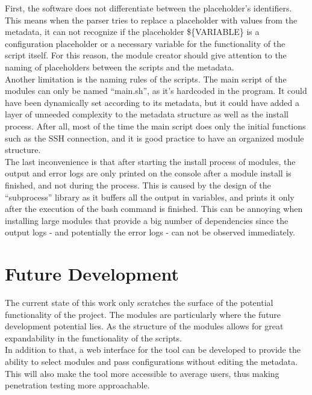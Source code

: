 First, the software does not differentiate between the placeholder’s identifiers. This means when the parser tries to replace a placeholder with values from the metadata, it can not recognize if the placeholder \$\{VARIABLE\} is a configuration placeholder or a necessary variable for the functionality of the script itself. For this reason, the module creator should give attention to the naming of placeholders between the scripts and the metadata.\\
Another limitation is the naming rules of the scripts. The main script of the modules can only be named “main.sh”, as it’s hardcoded in the program. It could have been dynamically set according to its metadata, but it could have added a layer of unneeded complexity to the metadata structure as well as the install process. After all, most of the time the main script does only the initial functions such as the SSH connection, and it is good practice to have an organized module structure.\\
The last inconvenience is that after starting the install process of modules, the output and error logs are only printed on the console after a module install is finished, and not during the process. This is caused by the design of the “subprocess” library as it buffers all the output in variables, and prints it only after the execution of the bash command is finished. This can be annoying when installing large modules that provide a big number of dependencies since the output logs - and potentially the error logs - can not be observed immediately.

\section{Future Development}
The current state of this work only scratches the surface of the potential functionality of the project. The modules are particularly where the future development potential lies. As the structure of the modules allows for great expandability in the functionality of the scripts.\\
In addition to that, a web interface for the tool can be developed to provide the ability to select modules and pass configurations without editing the metadata. This will also make the tool more accessible to average users, thus making penetration testing more approachable.
